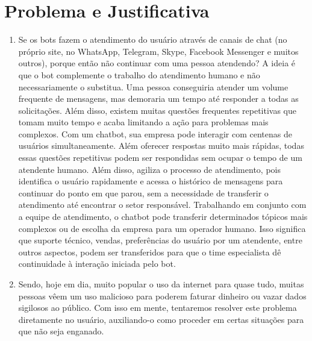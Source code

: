 \section{Problema e Justificativa}
\label{justificativa}

\begin{enumerate}
    \item
        Se os bots fazem o atendimento do usuário através de canais de chat (no próprio site, no WhatsApp, Telegram, Skype, Facebook Messenger e muitos outros), porque então não continuar com uma pessoa atendendo? A ideia é que o bot complemente o trabalho do atendimento humano e não necessariamente o substitua.
        Uma pessoa conseguiria atender um volume frequente de mensagens, mas demoraria um tempo até responder a todas as solicitações. Além disso, existem muitas questões frequentes repetitivas que tomam muito tempo e acaba limitando a ação para problemas mais complexos. 
        Com um chatbot, sua empresa pode interagir com centenas de usuários simultaneamente. Além oferecer respostas muito mais rápidas, todas essas questões repetitivas podem ser respondidas sem ocupar o tempo de um atendente humano. Além disso, agiliza o processo de atendimento, pois identifica o usuário rapidamente e acessa o histórico de mensagens para continuar do ponto em que parou, sem a necessidade de transferir o atendimento até encontrar o setor responsável.
        Trabalhando em conjunto com a equipe de atendimento, o chatbot pode transferir determinados tópicos mais complexos ou de escolha da empresa para um operador humano. Isso significa que suporte técnico, vendas, preferências do usuário por um atendente, entre outros aspectos, podem ser transferidos para que o time especialista dê continuidade à interação iniciada pelo bot.
    
    \item
        Sendo, hoje em dia, muito popular o uso da internet para quase tudo, muitas pessoas vêem um uso malicioso para poderem faturar dinheiro ou vazar dados sigilosos ao público. Com isso em mente, tentaremos resolver este problema diretamente no usuário, auxiliando-o como proceder em certas situações para que não seja enganado.
\end{enumerate}


 

